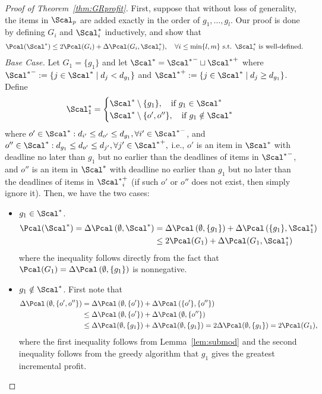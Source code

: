 \begin{proof}[Proof of Theorem~\ref{thm:GRprofit}]
    First, suppose that without loss of generality, the items in $\Scal_p$ are added exactly in the order of $g_1,\ldots,g_l$. Our proof is done by defining $G_i$ and $\Scal^*_i$ inductively, and show that 
\begin{align*}
\Pcal(\Scal^*)\le 2\Pcal(G_i) + \Delta\Pcal(G_i,\Scal^*_i),\quad \forall i\le \min\{l, m\} \text{ s.t. }\Scal_i^* \text{ is well-defined}.
\end{align*}
\emph{Base Case.}
Let $G_1 = \{g_1\}$ and let $\Scal^* = {\Scal^*}^-\sqcup {\Scal^*}^+$ where ${\Scal^*}^-:=\{j\in \Scal^*\mid d_j<d_{g_1}\}$ and ${\Scal^*}^+:=\{j\in \Scal^*\mid d_j\ge d_{g_1}\}$. Define
\begin{align*}
\Scal^*_1 = \begin{cases}
\Scal^*\setminus \{g_1\},\quad \text{if }g_1\in \Scal^*\\
\Scal^*\setminus \{o',o''\},\quad \text{if }g_1\notin \Scal^*
\end{cases}
\end{align*}
where $o'\in\Scal^*: d_{i'}\le d_{o'}\le d_{g_1},\forall i'\in {\Scal^*}^-$, and $o''\in\Scal^*: d_{g_1}\le d_{o'}\le d_{j'}, \forall j'\in{\Scal^*}^+, $ i.e., $o'$ is an item in $\Scal^*$ with deadline no later than $g_1$ but no earlier than the deadlines of items in ${\Scal^*}^-$, and $o''$ is an item in $\Scal^*$ with deadline no earlier than $g_{1}$ but no later than the deadlines of items in ${\Scal^*}^+_{i}$ (if such $o'$ or $o''$ does not exist, then simply ignore it). Then, we have the two cases:
\begin{itemize}
	\item $g_1\in\Scal^*$.
	\begin{align*}
	\Pcal(\Scal^*) = \Delta\Pcal\left(\emptyset, \Scal^*\right) &= \Delta\Pcal\left(\emptyset, \{g_1\}\right) + \Delta\Pcal\left(\{g_1\},\Scal_1^*\right)\\
	&\le 2\Pcal(G_1) + \Delta\Pcal(G_1,\Scal^*_1)
	\end{align*}
	where the inequality follows directly from the fact that $\Pcal(G_1) = \Delta\Pcal\left(\emptyset, \{g_1\}\right)$ is nonnegative.
	\item $g_1\notin \Scal^*$. First note that 
	\begin{align*}
	\Delta\Pcal\left(\emptyset, \left\{o',o''\right\}\right)&= \Delta\Pcal\left(\emptyset, \{o'\}\right) + \Delta\Pcal\left(\{o'\},\{o''\}\right)\\
	&\le \Delta\Pcal\left(\emptyset, \{o'\}\right) + \Delta\Pcal\left(\emptyset,\{o''\}\right)\\
	&\le \Delta\Pcal(\emptyset,\{g_1\}) + \Delta\Pcal(\emptyset,\{g_1\}) = 2\Delta\Pcal(\emptyset, \{g_1\}) = 2\Pcal(G_1),
	\end{align*}
	where the first inequality follows from Lemma~\ref{lem:submod} and the second inequality follows from the greedy algorithm that $g_1$ gives the greatest incremental profit.
	

\end{itemize}
\end{proof}
